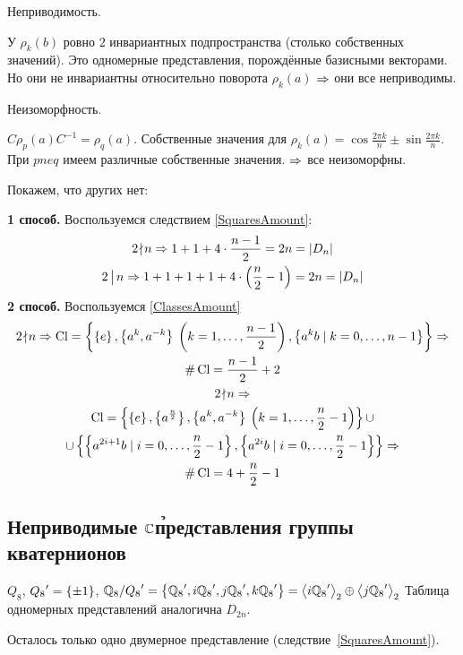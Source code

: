 \begin{points}{-3}
	\item Неприводимость.

		У $\rho_k(b)$ ровно $2$ инвариантных подпространства (столько собственных значений).
		Это одномерные представления, порождённые базисными векторами.
		Но они не инвариантны относительно поворота $\rho_k(a)$ $\Rightarrow$
		они все неприводимы.
	\item Неизоморфность.

		$C \rho_p(a) C^{-1} = \rho_q(a)$.
		Собственные значения для $\rho_k(a) = \cos \frac{2\pi k}n \pm \sin \frac{2\pi k}n$.
		При $p ne q$ имеем различные собственные значения. $\Rightarrow$ все неизоморфны.
	\item Покажем, что других нет:

		\textbf{1 способ.}
		Воспользуемся следствием \autoref{SquaresAmount}:
		\begin{gather*}
			2 \!\nmid\! n \Rightarrow
				1 + 1 + 4 \cdot \frac{n - 1}2 = 2n = \left|D_n\right| \\
			2 \,\bigl\rvert\, n \Rightarrow
				1 + 1 + 1 + 1 + 4 \cdot \left(\frac n 2 - 1\right) = 2n = \left|D_n\right|
		\end{gather*}
		\textbf{2 способ.}
		Воспользуемся \autoref{ClassesAmount}
		\begin{gather*}
			2 \!\nmid\! n \Rightarrow
				\operatorname{Cl} = \left\{\left\{e\right\}, \left\{a^k, a^{-k}\right\} \: \left(k = 1 ,\ldots, \frac{n - 1}2\right),
					\left\{a^k b \mid k = 0 ,\ldots, n - 1\right\}\right\} \Rightarrow \\
				\mathop{\#} \operatorname{Cl} = \frac{n - 1}2 + 2 \\
			2 \!\nmid\! n \Rightarrow \\
				\operatorname{Cl} = \left\{\left\{e\right\}, \left\{a^{\frac n 2}\right\}, \left\{a^k, a^{-k}\right\} \: \left(k = 1 ,\ldots, \frac n 2 - 1\right)\right\} \cup \\
					\cup \left\{\left\{a^{2 i + 1} b \mid i = 0 ,\ldots, \frac n 2 - 1\right\},
					\left\{a^{2 i} b \mid i = 0 ,\ldots, \frac n 2 - 1\right\}\right\} \Rightarrow \\
				\mathop{\#} \operatorname{Cl} = 4 + \frac n 2 - 1
		\end{gather*}
\end{points}

\subsection{Неприводимые $\mathbb{C}$\h представления группы кватернионов}
$Q_8$, ${Q_8}' = \left\{\pm 1\right\}$,
$\mathbb{Q}_8/{Q_8}' = \left\{{\mathbb{Q}_8}', i{\mathbb{Q}_8}', j{\mathbb{Q}_8}', k{\mathbb{Q}_8}'\right\} = {\left\langle i{\mathbb{Q}_8}'\right\rangle}_2 \oplus {\left\langle j{\mathbb{Q}_8}'\right\rangle}_2$
Таблица одномерных представлений аналогична $D_{2n}$.

Осталось только одно двумерное представление (следствие~\ref{SquaresAmount}).

